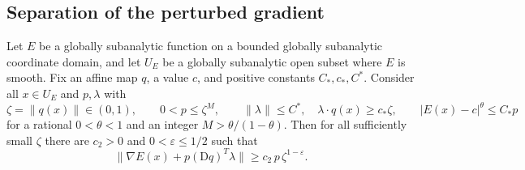 \subsection{Separation of the perturbed gradient}\label{sec:separation}

\begin{lemma}\label{lem:separation}
Let \(E\) be a globally subanalytic function on a bounded globally subanalytic coordinate domain, and let \(U_E\) be a globally subanalytic open subset where \(E\) is smooth. Fix an affine map \(q\), a value \(c\), and positive constants \(C_*,c_*,C^*\). Consider all \(x\in U_E\) and \(p,\lambda\) with
\[
 \zeta=\|q(x)\|\in(0,1),\qquad 0<p\le\zeta^M,\qquad
 \|\lambda\|\le C^*,\quad \lambda\cdot q(x)\ge c_*\zeta,\qquad
 |E(x)-c|^\theta\le C_*p
\]
for a rational \(0<\theta<1\) and an integer \(M>\theta/(1-\theta)\). Then for all sufficiently small \(\zeta\) there are \(c_2>0\) and \(0<\varepsilon\le 1/2\) such that
\begin{equation}\label{eq:separation}
 \|\nabla E(x)+p(\mathrm Dq)^T\lambda\|
 \ge c_2\,p\,\zeta^{1-\varepsilon}.
\end{equation}

\end{lemma}

